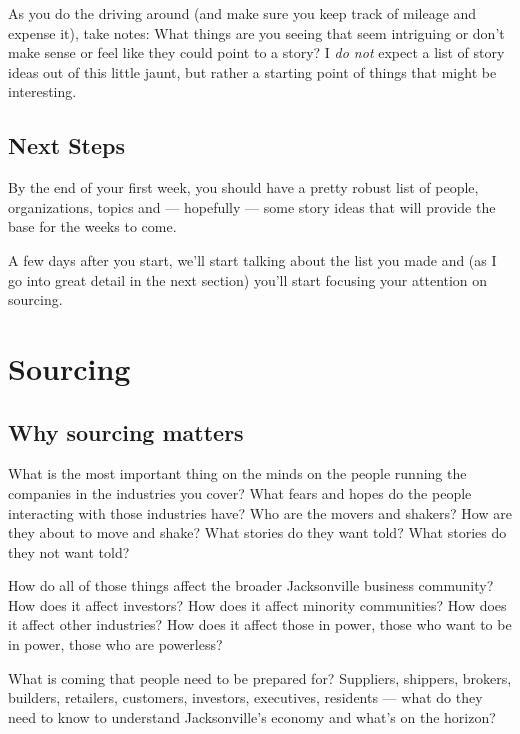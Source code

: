\documentclass[
  11pt,
  american,
  letterpaperpaper,
  extrafontsizes,onecolumn,openright
  ]{memoir}
\begin{document}
As you do the driving around (and make sure you keep track of mileage and expense it), take notes: What things are you seeing that seem intriguing or don't make sense or feel like they could point to a story? I \emph{do not} expect a list of story ideas out of this little jaunt, but rather a starting point of things that might be interesting.

\hypertarget{next-steps}{%
\section*{Next Steps}\label{next-steps}}

By the end of your first week, you should have a pretty robust list of people, organizations, topics and --- hopefully --- some story ideas that will provide the base for the weeks to come.

A few days after you start, we'll start talking about the list you made and (as I go into great detail in the next section) you'll start focusing your attention on sourcing.

\hypertarget{sourcing}{%
\chapter{Sourcing}\label{sourcing}}

\hypertarget{why-sourcing-matters}{%
\section*{Why sourcing matters}\label{why-sourcing-matters}}

What is the most important thing on the minds on the people running the companies in the industries you cover? What fears and hopes do the people interacting with those industries have? Who are the movers and shakers? How are they about to move and shake? What stories do they want told? What stories do they not want told?

How do all of those things affect the broader Jacksonville business community? How does it affect investors? How does it affect minority communities? How does it affect other industries? How does it affect those in power, those who want to be in power, those who are powerless?

What is coming that people need to be prepared for? Suppliers, shippers, brokers, builders, retailers, customers, investors, executives, residents --- what do they need to know to understand Jacksonville's economy and what's on the horizon?
\end{document}
